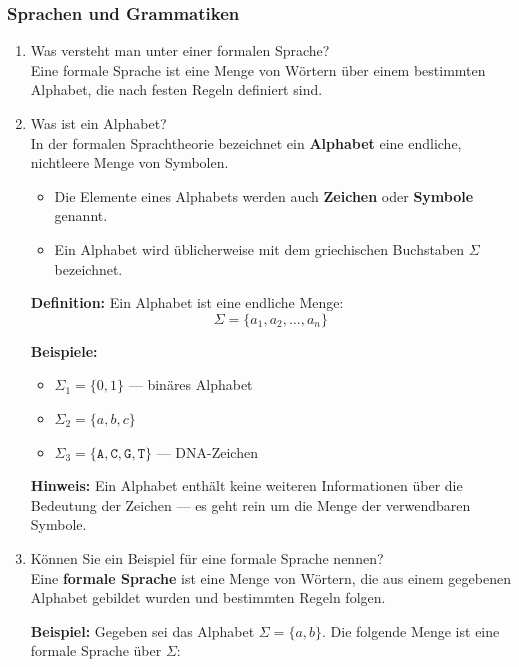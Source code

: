 \documentclass[a4paper,12pt]{article}
\begin{document}
		\subsubsection*{Sprachen und Grammatiken}
		\begin{enumerate}
			\item Was versteht man unter einer formalen Sprache?\\
			Eine formale Sprache ist eine Menge von Wörtern über einem bestimmten Alphabet, die nach festen Regeln definiert sind.
			\item Was ist ein Alphabet?\\
			
			In der formalen Sprachtheorie bezeichnet ein \textbf{Alphabet} eine endliche, nichtleere Menge von Symbolen.
			
			\begin{itemize}
				\item Die Elemente eines Alphabets werden auch \textbf{Zeichen} oder \textbf{Symbole} genannt.
				\item Ein Alphabet wird üblicherweise mit dem griechischen Buchstaben \( \Sigma \) bezeichnet.
			\end{itemize}
			
			\textbf{Definition:}  
			Ein Alphabet ist eine endliche Menge:
			\[
			\Sigma = \{ a_1, a_2, \dotsc, a_n \}
			\]
			
			\textbf{Beispiele:}
			\begin{itemize}
				\item \( \Sigma_1 = \{0,1\} \) — binäres Alphabet
				\item \( \Sigma_2 = \{a, b, c\} \)
				\item \( \Sigma_3 = \{\texttt{A}, \texttt{C}, \texttt{G}, \texttt{T}\} \) — DNA-Zeichen
			\end{itemize}
			
			\textbf{Hinweis:}  
			Ein Alphabet enthält keine weiteren Informationen über die Bedeutung der Zeichen — es geht rein um die Menge der verwendbaren Symbole.
			
			\item Können Sie ein Beispiel für eine formale Sprache nennen?\\
			
			Eine \textbf{formale Sprache} ist eine Menge von Wörtern, die aus einem gegebenen Alphabet gebildet wurden und bestimmten Regeln folgen.
			
			\textbf{Beispiel:}  
			Gegeben sei das Alphabet \( \Sigma = \{a, b\} \).  
			Die folgende Menge ist eine formale Sprache über \( \Sigma \):
			

\end{enumerate}
\end{document}
